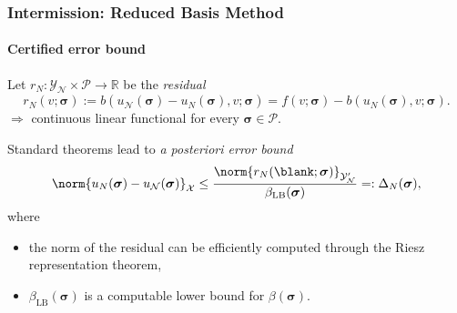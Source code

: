 \begin{frame}[t]
    \frametitle{Intermission: Reduced Basis Method}
    \framesubtitle{Certified error bound}
    Let $r_{N} \colon \mathcal Y_{\mathcal N} \times \mathcal P \to \mathbb{R}$ be the \emph{residual}
    \begin{equation}
        r_{N}(v; \bm \sigma) := b(u_{\mathcal N}(\bm \sigma) - u_{N}(\bm \sigma), v; \bm \sigma) = f(v; \bm \sigma) - b(u_{N}(\bm \sigma), v; \bm \sigma).
    \end{equation}
    $\Rightarrow$ continuous linear functional for every $\bm \sigma \in \mathcal P$.

    Standard theorems lead to \emph{a posteriori error bound}
    \begin{equation}
        \norm{u_{N}(\bm \sigma) - u_{\mathcal N}(\bm \sigma)}_{\mathcal X} \leq \frac{\norm{r_{N}(\blank; \bm \sigma)}_{\mathcal Y_{\mathcal N}'}}{\beta_{\mathrm{LB}}(\bm \sigma)} =: \Delta_{N}(\bm \sigma),
    \end{equation}
    where
    \begin{itemize}
        \item the norm of the residual can be efficiently computed through the Riesz representation theorem,
        \item $\beta_{\mathrm{LB}}(\bm \sigma)$ is a computable lower bound for $\beta(\bm \sigma)$.
    \end{itemize}
\end{frame}

